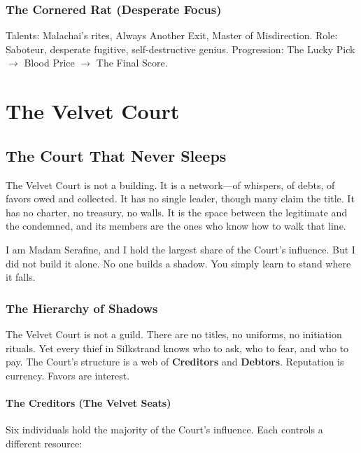 \documentclass[10pt,twoside]{book}
\begin{document}
\section{The Cornered Rat (Desperate Focus)}
Talents: Malachai's rites, Always Another Exit, Master of Misdirection.  
Role: Saboteur, desperate fugitive, self-destructive genius.  
Progression: The Lucky Pick $\rightarrow$ Blood Price $\rightarrow$ The Final Score.

\part{The Velvet Court}

\chapter{The Court That Never Sleeps}

The Velvet Court is not a building. It is a network---of whispers, of debts, of favors owed and collected. It has no single leader, though many claim the title. It has no charter, no treasury, no walls. It is the space between the legitimate and the condemned, and its members are the ones who know how to walk that line.

I am Madam Serafine, and I hold the largest share of the Court's influence. But I did not build it alone. No one builds a shadow. You simply learn to stand where it falls.

\section{The Hierarchy of Shadows}

The Velvet Court is not a guild. There are no titles, no uniforms, no initiation rituals. Yet every thief in Silkstrand knows who to ask, who to fear, and who to pay. The Court's structure is a web of \textbf{Creditors} and \textbf{Debtors}. Reputation is currency. Favors are interest.

\subsection{The Creditors (The Velvet Seats)}

Six individuals hold the majority of the Court's influence. Each controls a different resource:
\end{document}
